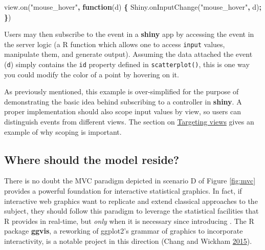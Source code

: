\documentclass[12pt,]{isuthesis}
\newenvironment{Shaded}{\begin{snugshade}}{\end{snugshade}}
\newcommand{\KeywordTok}[1]{\textcolor[rgb]{0.13,0.29,0.53}{\textbf{{#1}}}}
\newcommand{\DataTypeTok}[1]{\textcolor[rgb]{0.13,0.29,0.53}{{#1}}}
\newcommand{\DecValTok}[1]{\textcolor[rgb]{0.00,0.00,0.81}{{#1}}}
\newcommand{\StringTok}[1]{\textcolor[rgb]{0.31,0.60,0.02}{{#1}}}
\newcommand{\VariableTok}[1]{\textcolor[rgb]{0.00,0.00,0.00}{{#1}}}
\newcommand{\OperatorTok}[1]{\textcolor[rgb]{0.81,0.36,0.00}{\textbf{{#1}}}}
\newcommand{\AttributeTok}[1]{\textcolor[rgb]{0.77,0.63,0.00}{{#1}}}
\newcommand{\NormalTok}[1]{{#1}}
\begin{document}
\begin{Shaded}
\begin{Highlighting}[]
\VariableTok{view}\NormalTok{.}\AttributeTok{on}\NormalTok{(}\StringTok{"mouse_hover"}\OperatorTok{,} \KeywordTok{function}\NormalTok{(d) }\OperatorTok{\{}
  \VariableTok{Shiny}\NormalTok{.}\AttributeTok{onInputChange}\NormalTok{(}\StringTok{"mouse_hover"}\OperatorTok{,} \NormalTok{d)}\OperatorTok{;}
\OperatorTok{\}}\NormalTok{)}
\end{Highlighting}
\end{Shaded}

Users may then subscribe to the event in a \textbf{shiny} app by
accessing the event in the server logic (a R function which allows one
to access \texttt{input} values, manipulate them, and generate output).
Assuming the data attached the event (\texttt{d}) simply contains the
\texttt{id} property defined in \texttt{scatterplot()}, this is one way
you could modify the color of a point by hovering on it.

\begin{Shaded}
\end{Shaded}

As previously mentioned, this example is over-simplified for the purpose
of demonstrating the basic idea behind subscribing to a controller in
\textbf{shiny}. A proper implementation should also scope input values
by view, so users can distinguish events from different views. The
section on \protect\hyperlink{targeting-views}{Targeting views} gives an
example of why scoping is important.

\subsection{Where should the model
reside?}\label{where-should-the-model-reside}

There is no doubt the MVC paradigm depicted in scenario D of Figure
\ref{fig:mvc} provides a powerful foundation for interactive statistical
graphics. In fact, if interactive web graphics want to replicate and
extend classical approaches to the subject, they should follow this
paradigm to leverage the statistical facilities that R provides in
real-time, but \emph{only} when it is necessary since introducing . The
R package \textbf{ggvis}, a reworking of ggplot2's grammar of graphics
to incorporate interactivity, is a notable project in this direction
(Chang and Wickham \protect\hyperlink{ref-ggvis}{2015}).
\end{document}
